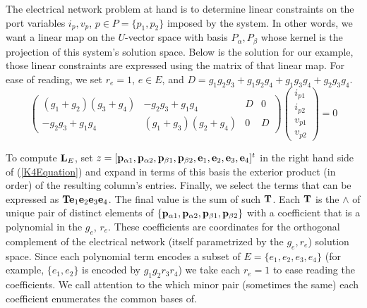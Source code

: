 The electrical network problem at hand is to determine linear constraints on the
port variables $i_p, v_p$, $p\in P = \{p_1, p_2\}$ imposed by the system.  In other words,
we want a linear map on the $U$-vector space with basis $P_\alpha, P_\beta$ whose kernel
is the projection of this system's solution space.
Below is the solution for our example,
those linear constraints
are expressed using the matrix of that linear map.  For ease of reading,
we set $r_e=1$, $e\in E$, and $D=g_{1} g_{2} g_{3} + g_{1} g_{2} g_{4} + g_{1} g_{3} g_{4} + g_{2} g_{3} g_{4}$.
\begin{equation}\label{K4Soln}
\left(\begin{array}{cccc}
{\left(g_{1} + g_{2}\right)} {\left(g_{3} + g_{4}\right)} & -g_{2} g_{3} + g_{1} g_{4} & D & 0 \\
-g_{2} g_{3} + g_{1} g_{4} & {\left(g_{1} + g_{3}\right)} {\left(g_{2} + g_{4}\right)} & 0 & D
\end{array}\right)
\left(\begin{array}{c} i_{p1} \\ i_{p2} \\ v_{p1} \\ v_{p2}
\end{array}\right) = 0
\end{equation}


To compute $\mathbf{L}_E$, set 
$z=[\mathbf{p}_{\alpha 1},\mathbf{p}_{\alpha 2},\mathbf{p}_{\beta 1},\mathbf{p}_{\beta 2},
  \mathbf{e}_1,  \mathbf{e}_2,  \mathbf{e}_3,  \mathbf{e}_4]^t$
in the right hand side of (\ref{K4Equation}) 
and expand in terms of this basis
the exterior product (in order) of the resulting column's entries.
Finally, we select
the terms that can be expressed as $\mathbf{T}\mathbf{e}_1\mathbf{e}_2\mathbf{e}_3\mathbf{e}_4$.  The final
value is the sum of such $\mathbf{T}$.
Each $\mathbf{T}$ is the $\wedge$ of unique pair of distinct elements
of $\{\mathbf{p}_{\alpha 1}, \mathbf{p}_{\alpha 2}, \mathbf{p}_{\beta 1}, \mathbf{p}_{\beta 2}\}$
with a coefficient that is a polynomial in the 
$g_e$, $r_e$.  These coefficients are \Plucker coordinates
for the orthogonal complement of the electrical network
(itself parametrized by the $g_e, r_e$) solution space.
Since each polynomial
term encodes a subset of $E=\{e_1, e_2, e_3, e_4\}$ (for example, $\{e_1, e_2\}$ is encoded
by $g_1g_2r_3r_4$) we take each $r_e=1$ to ease reading the coefficients. We call attention
to the which minor pair (sometimes the same) each coefficient enumerates
the common bases of.



